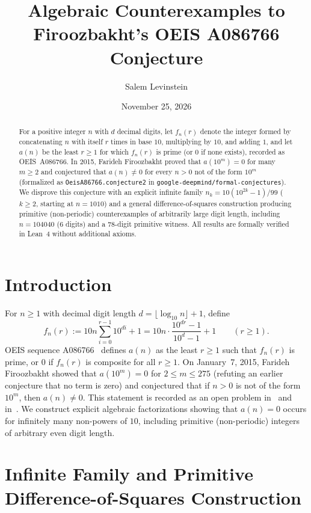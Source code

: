 \documentclass[11pt]{article}
\title{Algebraic Counterexamples to Firoozbakht's OEIS A086766 Conjecture}
\author{Salem Levinstein}
\date{November 25, 2026}
\theoremstyle{remark}
\begin{document}
\maketitle

\begin{abstract}
For a positive integer $n$ with $d$ decimal digits, let $f_n(r)$ denote the integer formed by concatenating $n$ with itself $r$ times in base $10$, multiplying by $10$, and adding $1$, and let $a(n)$ be the least $r \ge 1$ for which $f_n(r)$ is prime (or $0$ if none exists), recorded as OEIS~A086766. In 2015, Farideh Firoozbakht proved that $a(10^m) = 0$ for many $m \ge 2$ and conjectured that $a(n) \ne 0$ for every $n > 0$ not of the form $10^m$ (formalized as \texttt{OeisA86766.conjecture2} in \texttt{google-deepmind/formal-conjectures}). We disprove this conjecture with an explicit infinite family $n_k = 10(10^{2k} - 1)/99$ ($k \ge 2$, starting at $n = 1010$) and a general difference-of-squares construction producing primitive (non-periodic) counterexamples of arbitrarily large digit length, including $n = 104040$ ($6$ digits) and a $78$-digit primitive witness. All results are formally verified in Lean~4 without additional axioms.
\end{abstract}

\section{Introduction}

For $n \ge 1$ with decimal digit length $d = \lfloor \log_{10} n \rfloor + 1$, define
\[
  f_n(r) := 10 n \sum_{i=0}^{r-1} 10^{di} + 1 = 10 n \cdot \frac{10^{dr} - 1}{10^d - 1} + 1 \qquad (r \ge 1).
\]
OEIS sequence A086766~\cite{OEIS-A086766} defines $a(n)$ as the least $r \ge 1$ such that $f_n(r)$ is prime, or $0$ if $f_n(r)$ is composite for all $r \ge 1$. On January~7, 2015, Farideh Firoozbakht showed that $a(10^m) = 0$ for $2 \le m \le 275$ (refuting an earlier conjecture that no term is zero) and conjectured that if $n > 0$ is not of the form $10^m$, then $a(n) \ne 0$. This statement is recorded as an open problem in~\cite{OEIS-A086766} and in~\cite{FC}. We construct explicit algebraic factorizations showing that $a(n) = 0$ occurs for infinitely many non-powers of $10$, including primitive (non-periodic) integers of arbitrary even digit length.

\section{Infinite Family and Primitive Difference-of-Squares Construction}
\end{document}
